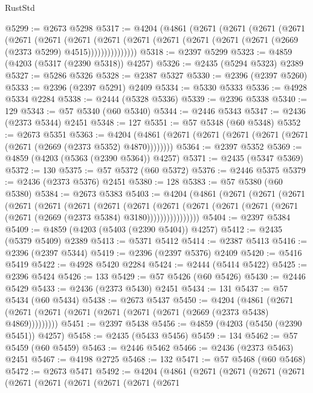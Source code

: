 \begin{lexlean}{RustStd}
\begin{coremodule}
@5299 := @2673 @5298
@5317 := @4204
    (@4861
      (@2671
        (@2671
          (@2671
            (@2671
              (@2671
                (@2671
                  (@2671
                    (@2671
                      (@2671 (@2671 (@2671 (@2671 (@2671 (@2669 (@2373 @5299) @4515)))))))))))))))
@5318 := @2397 @5299
@5323 := @4859 (@4203 (@5317 (@2390 @5318)) @4257)
@5326 := @2435 (@5294 @5323) @2389
@5327 := @5286 @5326
@5328 := @2387 @5327
@5330 := @2396 (@2397 @5260)
@5333 := @2396 (@2397 @5291) @2409
@5334 := @5330 @5333
@5336 := @4928 @5334 @2284
@5338 := @2444 (@5328 @5336)
@5339 := @2396 @5338
@5340 := 129
@5343 := @57 @5340 (@60 @5340)
@5344 := @2446 @5343
@5347 := @2436 (@2373 @5344) @2451
@5348 := 127
@5351 := @57 @5348 (@60 @5348)
@5352 := @2673 @5351
@5363 := @4204 (@4861 (@2671 (@2671 (@2671 (@2671 (@2671 (@2671 (@2669 (@2373 @5352) @4870))))))))
@5364 := @2397 @5352
@5369 := @4859 (@4203 (@5363 (@2390 @5364)) @4257)
@5371 := @2435 (@5347 @5369)
@5372 := 130
@5375 := @57 @5372 (@60 @5372)
@5376 := @2446 @5375
@5379 := @2436 (@2373 @5376) @2451
@5380 := 128
@5383 := @57 @5380 (@60 @5380)
@5384 := @2673 @5383
@5403 := @4204
    (@4861
      (@2671
        (@2671
          (@2671
            (@2671
              (@2671
                (@2671
                  (@2671
                    (@2671
                      (@2671
                        (@2671
                          (@2671 (@2671 (@2671 (@2671 (@2669 (@2373 @5384) @3180))))))))))))))))
@5404 := @2397 @5384
@5409 := @4859 (@4203 (@5403 (@2390 @5404)) @4257)
@5412 := @2435 (@5379 @5409) @2389
@5413 := @5371 @5412
@5414 := @2387 @5413
@5416 := @2396 (@2397 @5344)
@5419 := @2396 (@2397 @5376) @2409
@5420 := @5416 @5419
@5422 := @4928 @5420 @2284
@5424 := @2444 (@5414 @5422)
@5425 := @2396 @5424
@5426 := 133
@5429 := @57 @5426 (@60 @5426)
@5430 := @2446 @5429
@5433 := @2436 (@2373 @5430) @2451
@5434 := 131
@5437 := @57 @5434 (@60 @5434)
@5438 := @2673 @5437
@5450 := @4204
    (@4861 (@2671 (@2671 (@2671 (@2671 (@2671 (@2671 (@2671 (@2669 (@2373 @5438) @4869)))))))))
@5451 := @2397 @5438
@5456 := @4859 (@4203 (@5450 (@2390 @5451)) @4257)
@5458 := @2435 (@5433 @5456)
@5459 := 134
@5462 := @57 @5459 (@60 @5459)
@5463 := @2446 @5462
@5466 := @2436 (@2373 @5463) @2451
@5467 := @4198 @2725
@5468 := 132
@5471 := @57 @5468 (@60 @5468)
@5472 := @2673 @5471
@5492 := @4204
    (@4861
      (@2671
        (@2671
          (@2671
            (@2671
              (@2671
                (@2671
                  (@2671
                    (@2671
                      (@2671
                        (@2671

\end{coremodule}
\end{lexlean}
